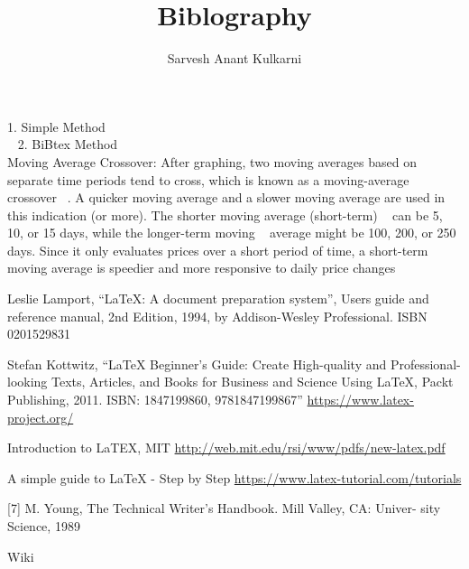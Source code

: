 \documentclass[11pt,a4paper]{report}
\author{Sarvesh Anant Kulkarni}
\title{Biblography}
\begin{document}
\maketitle

1. Simple Method\\
~\cite{sar}
2. BiBtex Method\\

Moving Average Crossover: After graphing, two 
moving averages based on separate time periods tend to cross, 
which is known as a moving-average crossover ~\cite{abc}. A quicker 
moving average and a slower moving average are used in this 
indication (or more). The shorter moving average (short-term) ~\cite{pqr}
can be 5, 10, or 15 days, while the longer-term moving ~\cite{aa,sarvesh}
average might be 100, 200, or 250 days. Since it only 
evaluates prices over a short period of time, a short-term 
moving average is speedier and more responsive to daily 
price changes ~\cite{sarvesh,soniya}


\begin{thebibliography} {}

 Leslie Lamport, “LaTeX: A document preparation system”, Users guide and reference manual, 2nd Edition, 1994, by Addison-Wesley Professional. ISBN 0201529831

Stefan Kottwitz, “LaTeX Beginner's Guide: Create High-quality and Professional-looking Texts, Articles, and Books for Business and Science Using LaTeX, Packt Publishing, 2011. ISBN: 1847199860, 9781847199867” 
\href{https://www.latex-project.org/}{https://www.latex-project.org/}

 Introduction to LaTEX, MIT
\href{http://web.mit.edu/rsi/www/pdfs/new-latex.pdf}{http://web.mit.edu/rsi/www/pdfs/new-latex.pdf}

A simple guide to LaTeX - Step by Step
\href{https://www.latex-tutorial.com/tutorials}{https://www.latex-tutorial.com/tutorials}

[7] M. Young, The Technical Writer’s Handbook. Mill Valley, CA: Univer-
sity Science, 1989

 Wiki

\end{thebibliography} 
\end{document}
